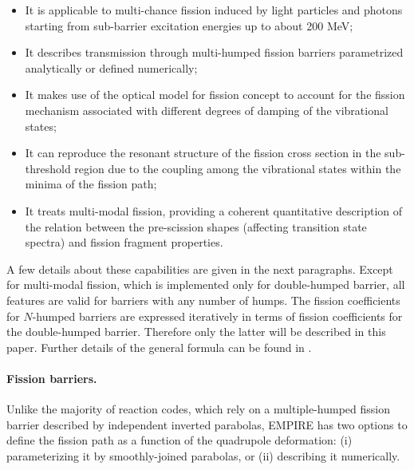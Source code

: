 \begin{itemize}
\item It is applicable to multi-chance fission induced by light particles and
photons starting from sub-barrier excitation energies up to about 200 MeV;

\item It describes transmission through multi-humped fission barriers
parametrized analytically or defined numerically;

\item It makes use of the optical model for fission concept to account for the
fission mechanism associated with different degrees of damping of the
vibrational states;

\item It can reproduce the resonant structure of the fission cross section in
the sub-threshold region due to the coupling among the vibrational states
within the minima of the fission path;

\item It treats multi-modal fission, providing a coherent quantitative
description of the relation between the pre-scission shapes (affecting
transition state spectra) and fission fragment properties.
\end{itemize}

A few details about these capabilities are given in the next paragraphs.
Except for multi-modal fission, which is implemented only for double-humped
barrier, all features are valid for barriers with any number of humps.
The fission coefficients for $N$-humped barriers are expressed iteratively
in terms of fission coefficients for the double-humped barrier. Therefore
only the latter will be described in this paper. Further details of the general
formula can be found in \cite{Sin:07}. \newline

\medskip


\paragraph*{Fission barriers.}

Unlike the majority of reaction codes, which rely on a multiple-humped fission
barrier described by independent inverted parabolas, EMPIRE has two options
to define the fission path as a function of the quadrupole deformation: (i)
parameterizing it by smoothly-joined parabolas, or (ii) describing it numerically.

